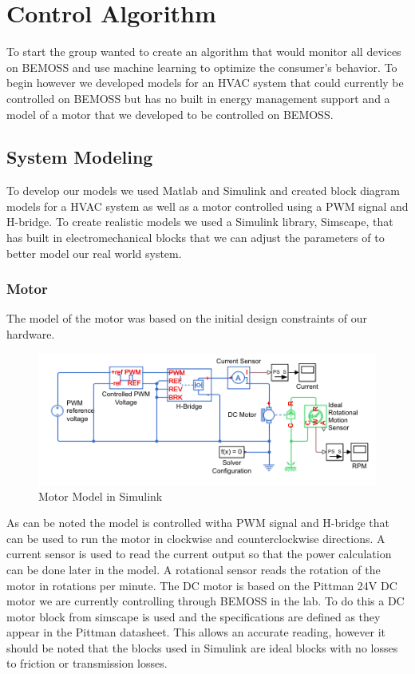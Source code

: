 \chapter{Control Algorithm}
To start the group wanted to create an algorithm that would monitor all devices on BEMOSS and use machine learning to optimize the consumer's behavior. To begin however we developed models for an HVAC system that could currently be controlled on BEMOSS but has no built in energy management support and a model of a motor that we developed to be controlled on BEMOSS. 
\section{System Modeling}
To develop our models we used Matlab and Simulink and created block diagram models for a HVAC system as well as a motor controlled using a PWM signal and H-bridge. To create realistic models we used a Simulink library, Simscape, that has built in electromechanical blocks that we can adjust the parameters of to better model our real world system.

\subsection{Motor}
The model of the motor was based on the initial design constraints of our hardware. 
\begin{figure}
    \centering
    \includegraphics{figs/img/motorModelWithHBridge.png}
    \caption{Motor Model in Simulink}
    \label{fig:my_label}
\end{figure}
As can be noted the model is controlled witha  PWM signal and H-bridge that can be used to run the motor in clockwise and counterclockwise directions. A current sensor is used to read the current output so that the power calculation can be done later in the model. A rotational sensor reads the rotation of the motor in rotations per minute. The DC motor is based on the Pittman 24V DC motor we are currently controlling through BEMOSS in the lab. To do this a DC motor block from simscape is used and the specifications are defined as they appear in the Pittman datasheet. This allows an accurate reading, however it should be noted that the blocks used in Simulink are ideal blocks with no losses to friction or transmission losses. 
